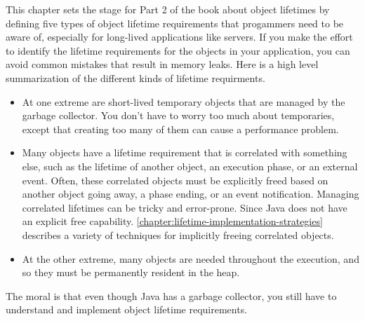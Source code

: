 This chapter sets the stage for Part 2 of the book about object lifetimes by
defining five types of object lifetime requirements that progammers need to be aware of, 
especially for long-lived applications like servers. If
you make the effort to identify the lifetime requirements for the objects in
your application, you can avoid common mistakes that result in memory leaks.
Here is a high level summarization of the different kinds of lifetime
requirments.
\begin{itemize}
  \item At one extreme are short-lived temporary objects that are managed
  by the \jre garbage collector. You don't have to worry too much about temporaries, except that
  creating too many of them can cause a performance problem.
  \item Many objects have a lifetime requirement that is correlated with 
   something else, such as the lifetime of another object, an execution phase,
   or an external event. Often, these correlated objects must be explicitly freed based on
    another object going away, a phase ending, or an event
   notification. Managing correlated lifetimes can be tricky and
   error-prone. Since Java does not have an explicit free
   capability.
   \autoref{chapter:lifetime-implementation-strategies}
   describes a variety of techniques for implicitly freeing
   correlated objects. 
   \item At the other extreme, many objects are needed throughout
   the execution, and so they must be permanently resident in the heap.
\end{itemize}
 The moral is that even though Java has a garbage collector, you still have to
 understand and implement object lifetime requirements.





